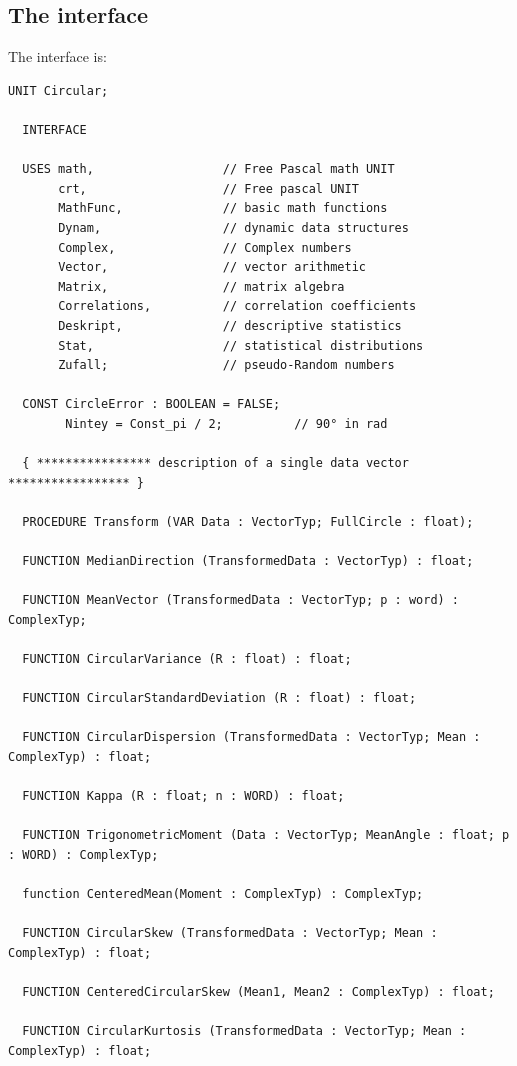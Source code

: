 \begin{refsection}
\section{The interface}

The interface is:
\begin{lstlisting}[caption=Interface of unit Circular]
  UNIT Circular;

  INTERFACE

  USES math,                  // Free Pascal math UNIT
       crt,                   // Free pascal UNIT
       MathFunc,              // basic math functions
       Dynam,                 // dynamic data structures
       Complex,               // Complex numbers
       Vector,                // vector arithmetic
       Matrix,                // matrix algebra
       Correlations,          // correlation coefficients
       Deskript,              // descriptive statistics
       Stat,                  // statistical distributions
       Zufall;                // pseudo-Random numbers

  CONST CircleError : BOOLEAN = FALSE;
        Nintey = Const_pi / 2;          // 90° in rad

  { **************** description of a single data vector ***************** }

  PROCEDURE Transform (VAR Data : VectorTyp; FullCircle : float);

  FUNCTION MedianDirection (TransformedData : VectorTyp) : float;

  FUNCTION MeanVector (TransformedData : VectorTyp; p : word) : ComplexTyp;

  FUNCTION CircularVariance (R : float) : float;

  FUNCTION CircularStandardDeviation (R : float) : float;

  FUNCTION CircularDispersion (TransformedData : VectorTyp; Mean : ComplexTyp) : float;

  FUNCTION Kappa (R : float; n : WORD) : float;

  FUNCTION TrigonometricMoment (Data : VectorTyp; MeanAngle : float; p : WORD) : ComplexTyp;

  function CenteredMean(Moment : ComplexTyp) : ComplexTyp;

  FUNCTION CircularSkew (TransformedData : VectorTyp; Mean : ComplexTyp) : float;

  FUNCTION CenteredCircularSkew (Mean1, Mean2 : ComplexTyp) : float;

  FUNCTION CircularKurtosis (TransformedData : VectorTyp; Mean : ComplexTyp) : float;


\end{lstlisting}
\end{refsection}
